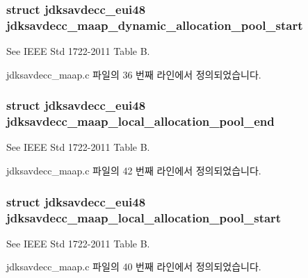 \subsubsection[{\texorpdfstring{jdksavdecc\+\_\+maap\+\_\+dynamic\+\_\+allocation\+\_\+pool\+\_\+start}{jdksavdecc_maap_dynamic_allocation_pool_start}}]{\setlength{\rightskip}{0pt plus 5cm}struct {\bf jdksavdecc\+\_\+eui48} jdksavdecc\+\_\+maap\+\_\+dynamic\+\_\+allocation\+\_\+pool\+\_\+start}\hypertarget{group__maap_ga0b0791ba795b6f2f27b392ec448d5b1f}{}\label{group__maap_ga0b0791ba795b6f2f27b392ec448d5b1f}
See I\+E\+EE Std 1722-\/2011 Table B. 

jdksavdecc\+\_\+maap.\+c 파일의 36 번째 라인에서 정의되었습니다.

\subsubsection[{\texorpdfstring{jdksavdecc\+\_\+maap\+\_\+local\+\_\+allocation\+\_\+pool\+\_\+end}{jdksavdecc_maap_local_allocation_pool_end}}]{\setlength{\rightskip}{0pt plus 5cm}struct {\bf jdksavdecc\+\_\+eui48} jdksavdecc\+\_\+maap\+\_\+local\+\_\+allocation\+\_\+pool\+\_\+end}\hypertarget{group__maap_ga613f18192fb8974b3bb889465dfa55f4}{}\label{group__maap_ga613f18192fb8974b3bb889465dfa55f4}
See I\+E\+EE Std 1722-\/2011 Table B. 

jdksavdecc\+\_\+maap.\+c 파일의 42 번째 라인에서 정의되었습니다.

\subsubsection[{\texorpdfstring{jdksavdecc\+\_\+maap\+\_\+local\+\_\+allocation\+\_\+pool\+\_\+start}{jdksavdecc_maap_local_allocation_pool_start}}]{\setlength{\rightskip}{0pt plus 5cm}struct {\bf jdksavdecc\+\_\+eui48} jdksavdecc\+\_\+maap\+\_\+local\+\_\+allocation\+\_\+pool\+\_\+start}\hypertarget{group__maap_gad50c2a9baf15dd4433e9c95ed696943d}{}\label{group__maap_gad50c2a9baf15dd4433e9c95ed696943d}
See I\+E\+EE Std 1722-\/2011 Table B. 

jdksavdecc\+\_\+maap.\+c 파일의 40 번째 라인에서 정의되었습니다.

